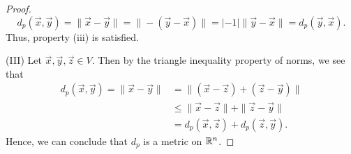 \documentclass[a4paper]{article}
\begin{document}
\begin{proof}
            \[  {d}_{p}(\vec{ x } ,\vec{ y } ) = \|\vec{ x }  - \vec{ y }  \| = \| -(\vec{ y } -\vec{ x } )\| = | -1 | \| \vec{ y }  - \vec{ x }  \| = {d}_{p}(\vec{ y } ,\vec{ x } ).  \]
            Thus, property (iii) is satisfied.
        \item[(III)] Let \( \vec{ x } ,\vec{ y } ,\vec{ z }  \in V  \). Then by the triangle inequality property of norms, we see that 
            \begin{align*}
                {d}_{p}(\vec{ x } ,\vec{ y } ) = \|\vec{ x }  - \vec{ y } \|  &= \|(\vec{ x }  - \vec{ z } ) + (\vec{ z }  - \vec{ y } )\|  \\
                                    &\leq \|\vec{ x }  - \vec{ z }  \| + \| \vec{ z }  - \vec{ y } \| \\
                                    &= {d}_{p}(\vec{ x } ,\vec{ z } ) + {d}_{p}(\vec{ z } ,\vec{ y } ).
            \end{align*}
            Hence, we can conclude that \( {d}_{p} \) is a metric on \( \mathbb{R}^{n} \).
\end{proof}
\end{document}
